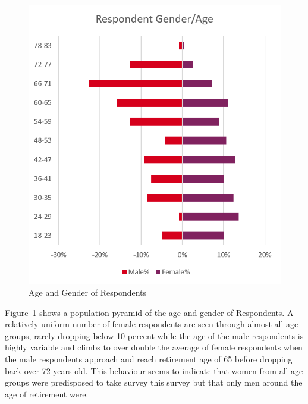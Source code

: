 \begin{figure}
\centering
\includegraphics[scale=0.5]{figures/ResponseGender.png} 
\caption{Age and Gender of Respondents}
\label{fig:ResponseGender}
\end{figure}
Figure~\ref{fig:ResponseGender} shows a population pyramid of the age and gender of Respondents. A relatively uniform number of female respondents are seen through almost all age groups, rarely dropping below 10 percent while the age of the male respondents is highly variable and climbs to over double the average of female respondents when the male respondents approach and reach retirement age of 65 before dropping back over 72 years old. This behaviour seems to indicate that women from all age groups were predisposed to take survey this survey but that only men around the age of retirement were. 

